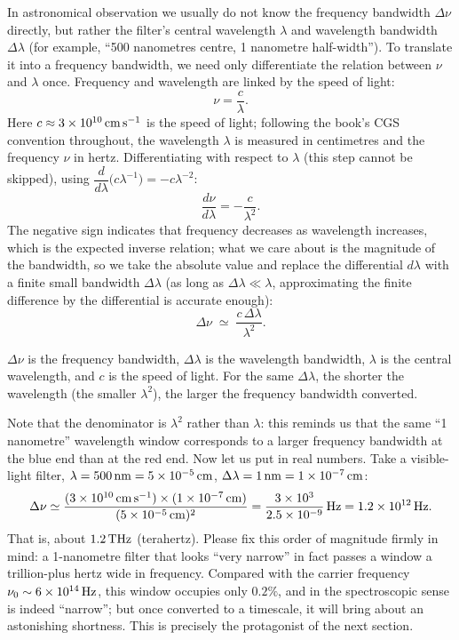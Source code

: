 In astronomical observation we usually do not know the frequency bandwidth \(\Delta\nu\) directly, but rather the filter's central wavelength \(\lambda\) and wavelength bandwidth \(\Delta\lambda\) (for example, ``500 nanometres centre, 1 nanometre half-width''). To translate it into a frequency bandwidth, we need only differentiate the relation between \(\nu\) and \(\lambda\) once. Frequency and wavelength are linked by the speed of light:
\[
  \nu=\frac{c}{\lambda}.
\]
Here \(c\approx3\times10^{10}\,{\rm cm\,s^{-1}}\) is the speed of light; following the book's CGS convention throughout, the wavelength \(\lambda\) is measured in centimetres and the frequency \(\nu\) in hertz. Differentiating with respect to \(\lambda\) (this step cannot be skipped), using \(\dfrac{d}{d\lambda}\bigl(c\lambda^{-1}\bigr)=-c\lambda^{-2}\):
\[
  \frac{d\nu}{d\lambda}=-\frac{c}{\lambda^{2}}.
\]
The negative sign indicates that frequency decreases as wavelength increases, which is the expected inverse relation; what we care about is the magnitude of the bandwidth, so we take the absolute value and replace the differential \(d\lambda\) with a finite small bandwidth \(\Delta\lambda\) (as long as \(\Delta\lambda\ll\lambda\), approximating the finite difference by the differential is accurate enough):
\begin{equation}
  \Delta\nu\;\simeq\;\frac{c\,\Delta\lambda}{\lambda^{2}} .
  \label{eq:e02-bandwidth-conversion}
\end{equation}
\begin{formulaexplain}
\(\Delta\nu\) is the frequency bandwidth, \(\Delta\lambda\) is the wavelength bandwidth, \(\lambda\) is the central wavelength, and \(c\) is the speed of light. For the same \(\Delta\lambda\), the shorter the wavelength (the smaller \(\lambda^2\)), the larger the frequency bandwidth converted.
\end{formulaexplain}
Note that the denominator is \(\lambda^{2}\) rather than \(\lambda\): this reminds us that the same ``1 nanometre'' wavelength window corresponds to a larger frequency bandwidth at the blue end than at the red end. Now let us put in real numbers. Take a visible-light filter, \(\lambda=500\,{\rm nm}=5\times10^{-5}\,{\rm cm}\), \(\Delta\lambda=1\,{\rm nm}=1\times10^{-7}\,{\rm cm}\):
\[
  \Delta\nu\simeq
  \frac{(3\times10^{10}\,{\rm cm\,s^{-1}})\times(1\times10^{-7}\,{\rm cm})}
       {(5\times10^{-5}\,{\rm cm})^{2}}
  =\frac{3\times10^{3}}{2.5\times10^{-9}}\,{\rm Hz}
  =1.2\times10^{12}\,{\rm Hz}.
\]
That is, about \(1.2\,{\rm THz}\) (terahertz). Please fix this order of magnitude firmly in mind: a 1-nanometre filter that looks ``very narrow'' in fact passes a window a trillion-plus hertz wide in frequency. Compared with the carrier frequency \(\nu_0\sim6\times10^{14}\,{\rm Hz}\), this window occupies only \(0.2\%\), and in the spectroscopic sense is indeed ``narrow''; but once converted to a timescale, it will bring about an astonishing shortness. This is precisely the protagonist of the next section.

